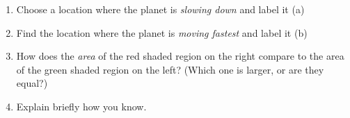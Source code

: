 \documentclass[12pt]{article}
\begin{document}
\begin{enumerate}
	\begin{enumerate}
		\item Choose a location where the planet is {\it slowing down} and label it (a)
		\item Find the location where the planet is {\it moving fastest} and label it (b)
		\item How does the {\it area} of the red shaded region on the right compare to the area of the green shaded region on the left? (Which one is larger, or are they equal?)
		
		\vspace{1in}
		
		\item Explain briefly how you know.
		
	\end{enumerate}


	\end{enumerate}

	
\end{document}

